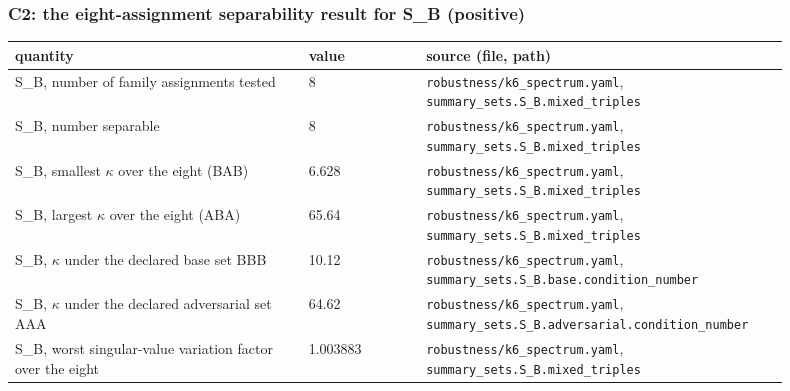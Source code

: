 \subsubsection*{C2: the eight-assignment separability result for S\_B (positive)}
\begin{longtable}{p{0.35\linewidth} p{0.14\linewidth} p{0.41\linewidth}}
\toprule
quantity & value & source (file, path) \\
\midrule
\endhead
S\_B, number of family assignments tested & 8 & \texttt{\footnotesize robustness/k6\_\allowbreak{}spectrum.\allowbreak{}yaml}, \texttt{\footnotesize summary\_\allowbreak{}sets.\allowbreak{}S\_\allowbreak{}B.\allowbreak{}mixed\_\allowbreak{}triples} \\
S\_B, number separable & 8 & \texttt{\footnotesize robustness/k6\_\allowbreak{}spectrum.\allowbreak{}yaml}, \texttt{\footnotesize summary\_\allowbreak{}sets.\allowbreak{}S\_\allowbreak{}B.\allowbreak{}mixed\_\allowbreak{}triples} \\
S\_B, smallest $\kappa$ over the eight (BAB) & 6.628 & \texttt{\footnotesize robustness/k6\_\allowbreak{}spectrum.\allowbreak{}yaml}, \texttt{\footnotesize summary\_\allowbreak{}sets.\allowbreak{}S\_\allowbreak{}B.\allowbreak{}mixed\_\allowbreak{}triples} \\
S\_B, largest $\kappa$ over the eight (ABA) & 65.64 & \texttt{\footnotesize robustness/k6\_\allowbreak{}spectrum.\allowbreak{}yaml}, \texttt{\footnotesize summary\_\allowbreak{}sets.\allowbreak{}S\_\allowbreak{}B.\allowbreak{}mixed\_\allowbreak{}triples} \\
S\_B, $\kappa$ under the declared base set BBB & 10.12 & \texttt{\footnotesize robustness/k6\_\allowbreak{}spectrum.\allowbreak{}yaml}, \texttt{\footnotesize summary\_\allowbreak{}sets.\allowbreak{}S\_\allowbreak{}B.\allowbreak{}base.\allowbreak{}condition\_\allowbreak{}number} \\
S\_B, $\kappa$ under the declared adversarial set AAA & 64.62 & \texttt{\footnotesize robustness/k6\_\allowbreak{}spectrum.\allowbreak{}yaml}, \texttt{\footnotesize summary\_\allowbreak{}sets.\allowbreak{}S\_\allowbreak{}B.\allowbreak{}adversarial.\allowbreak{}condition\_\allowbreak{}number} \\
S\_B, worst singular-value variation factor over the eight & 1.003883 & \texttt{\footnotesize robustness/k6\_\allowbreak{}spectrum.\allowbreak{}yaml}, \texttt{\footnotesize summary\_\allowbreak{}sets.\allowbreak{}S\_\allowbreak{}B.\allowbreak{}mixed\_\allowbreak{}triples} \\

\end{longtable}
